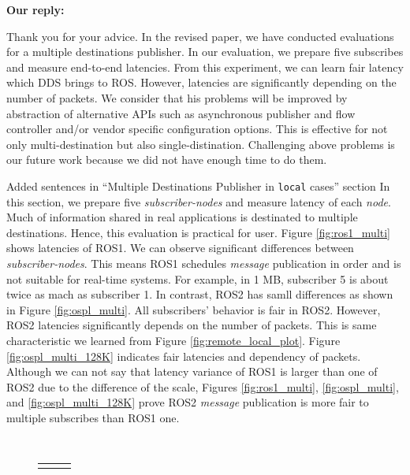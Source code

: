 \documentclass{article}
\begin{document}
\begin{enumerate}
  \begin{flushleft}
    \textbf{Our reply:}
  \end{flushleft}
  Thank you for your advice.
  In the revised paper, we have conducted evaluations for a multiple destinations publisher.
  In our evaluation, we prepare five subscribes and measure end-to-end latencies.
  From this experiment, we can learn fair latency which DDS brings to ROS.
  However, latencies are significantly depending on the number of packets.
  We consider that his problems will be improved by abstraction of alternative APIs such as asynchronous publisher and flow controller and/or vendor specific configuration options.
  This is effective for not only multi-destination but also single-distination.
  Challenging above problems is our future work because we did not have enough time to do them.
  \begin{itembox}[|]{Added sentences in ``Multiple Destinations Publisher in \texttt{local} cases'' section}
    In this section, we prepare five \emph{subscriber-nodes} and measure latency of each \emph{node}.
    Much of information shared in real applications is destinated to multiple destinations.
    Hence, this evaluation is practical for user.
    Figure \ref{fig:ros1_multi} shows latencies of ROS1.
    We can observe significant differences between \emph{subscriber-nodes}.
    This means ROS1 schedules \emph{message} publication in order and is not suitable for real-time systems.
    For example, in 1 MB, subscriber 5 is about twice as mach as subscriber 1.
    In contrast, ROS2 has samll differences as shown in Figure \ref{fig:ospl_multi}.
    All subscribers' behavior is fair in ROS2.
    However, ROS2 latencies significantly depends on the number of packets.
    This is same characteristic we learned from Figure \ref{fig:remote_local_plot}.
    Figure \ref{fig:ospl_multi_128K} indicates fair latencies and dependency of packets.
    Although we can not say that latency variance of ROS1 is larger than one of ROS2 due to the difference of the scale, Figures \ref{fig:ros1_multi}, \ref{fig:ospl_multi}, and \ref{fig:ospl_multi_128K} prove ROS2 \emph{message} publication is more fair to multiple subscribes than ROS1 one.
  \end{itembox}\\
  \setcounter{figure}{15}
  \begin{figure}[h]
    \begin{tabular}{ccc}
      \begin{minipage}[t]{0.31\textwidth}

\end{minipage}
\end{tabular}
\end{figure}
\end{enumerate}
\end{document}
